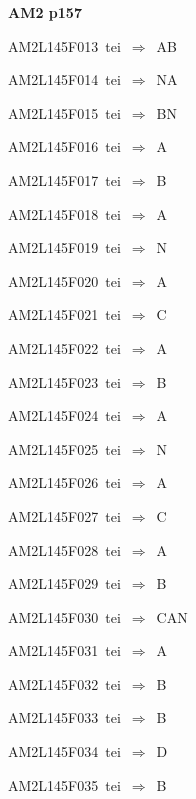 \par\vfill\eject
{\bf\hfill AM2 p157\hfill\hbox{}}\par\bigskip
{\sixrm AM2L145F013\ {\sixit tei}\ }$\Rightarrow$\ AB\par\smallskip
{\sixrm AM2L145F014\ {\sixit tei}\ }$\Rightarrow$\ NA\par\smallskip
{\sixrm AM2L145F015\ {\sixit tei}\ }$\Rightarrow$\ BN\par\smallskip
{\sixrm AM2L145F016\ {\sixit tei}\ }$\Rightarrow$\ A\par\smallskip
{\sixrm AM2L145F017\ {\sixit tei}\ }$\Rightarrow$\ B\par\smallskip
{\sixrm AM2L145F018\ {\sixit tei}\ }$\Rightarrow$\ A\par\smallskip
{\sixrm AM2L145F019\ {\sixit tei}\ }$\Rightarrow$\ N\par\smallskip
{\sixrm AM2L145F020\ {\sixit tei}\ }$\Rightarrow$\ A\par\smallskip
{\sixrm AM2L145F021\ {\sixit tei}\ }$\Rightarrow$\ C\par\smallskip
{\sixrm AM2L145F022\ {\sixit tei}\ }$\Rightarrow$\ A\par\smallskip
{\sixrm AM2L145F023\ {\sixit tei}\ }$\Rightarrow$\ B\par\smallskip
{\sixrm AM2L145F024\ {\sixit tei}\ }$\Rightarrow$\ A\par\smallskip
{\sixrm AM2L145F025\ {\sixit tei}\ }$\Rightarrow$\ N\par\smallskip
{\sixrm AM2L145F026\ {\sixit tei}\ }$\Rightarrow$\ A\par\smallskip
{\sixrm AM2L145F027\ {\sixit tei}\ }$\Rightarrow$\ C\par\smallskip
{\sixrm AM2L145F028\ {\sixit tei}\ }$\Rightarrow$\ A\par\smallskip
{\sixrm AM2L145F029\ {\sixit tei}\ }$\Rightarrow$\ B\par\smallskip
{\sixrm AM2L145F030\ {\sixit tei}\ }$\Rightarrow$\ CAN\par\smallskip
{\sixrm AM2L145F031\ {\sixit tei}\ }$\Rightarrow$\ A\par\smallskip
{\sixrm AM2L145F032\ {\sixit tei}\ }$\Rightarrow$\ B\par\smallskip
{\sixrm AM2L145F033\ {\sixit tei}\ }$\Rightarrow$\ B\par\smallskip
{\sixrm AM2L145F034\ {\sixit tei}\ }$\Rightarrow$\ D\par\smallskip
{\sixrm AM2L145F035\ {\sixit tei}\ }$\Rightarrow$\ B\par\smallskip


